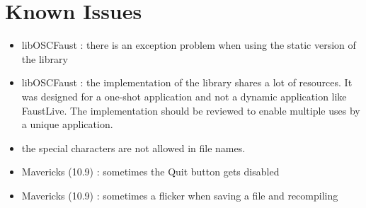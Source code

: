 \documentclass[a4paper]{article}
\begin{document}
\section{Known Issues}

\begin{itemize}
\item libOSCFaust : there is an exception problem when using the static version of the library
\item libOSCFaust : the implementation of the library shares a lot of resources. It was designed for a one-shot application and not a dynamic application like FaustLive. The implementation should be reviewed to enable multiple uses by a unique application. 
\item the special characters are not allowed in file names.
\item Mavericks (10.9) : sometimes the Quit button gets disabled
\item Mavericks (10.9) : sometimes a flicker when saving a file and recompiling
\end{itemize}
\end{document}
